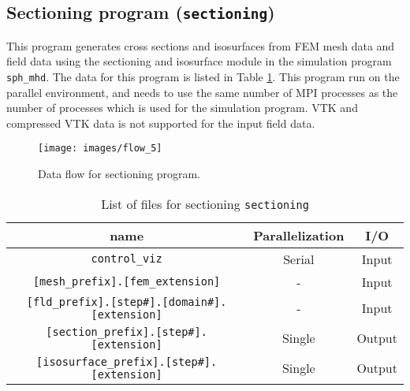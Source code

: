 \subsection{Sectioning program ({\tt sectioning})} \label{sec:sectioning}
This program generates cross sections and isosurfaces from FEM mesh data and field data using the sectioning and isosurface module in the simulation program {\tt sph\_mhd}. The data for this program is listed in Table \ref{table:sectioning}. This program run on the parallel environment, and needs to use the same number of MPI processes as the number of processes which is used for the simulation program. VTK and compressed VTK data is not supported for the input field data.
%
\begin{figure}[htbp]
\begin{center}
\texttt{[image: images/flow\_5]}
\end{center}
\caption{Data flow for sectioning program.}
\label{fig:flow_add_ini}
\end{figure}
%
\begin{table}[htp]
\caption{List of files for sectioning {\tt sectioning} }
\begin{center} 
\begin{tabular}{|c|c|c|}
\hline
name & Parallelization & I/O \\ \hline \hline
\verb|control_viz| & Serial & Input \\ \hline
\verb|[mesh_prefix].[fem_extension]| & - & Input \\ \hline
\verb|[fld_prefix].[step#].[domain#].[extension]| & - & Input  \\ \hline
\verb|[section_prefix].[step#].[extension]| &  Single & Output  \\
\verb|[isosurface_prefix].[step#].[extension]| &  Single & Output  \\ \hline
\end{tabular}
\end{center}
\label{table:sectioning}
\end{table}
%

